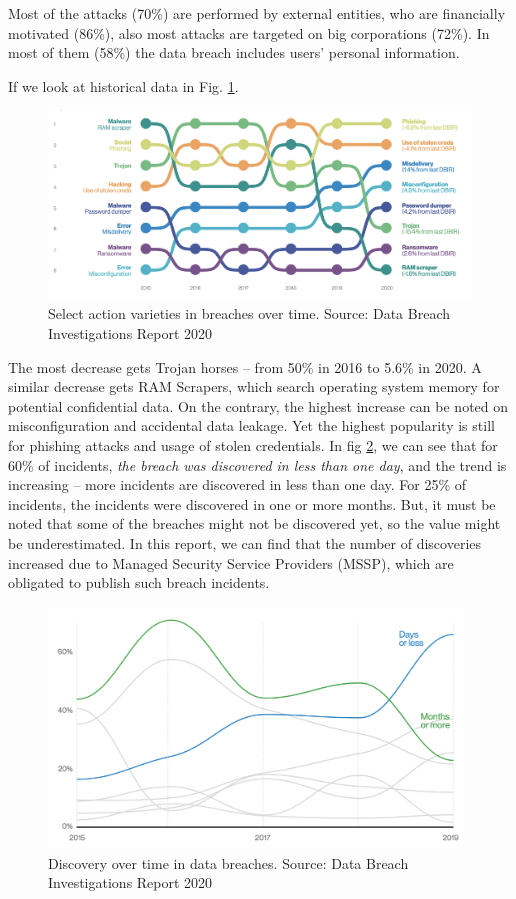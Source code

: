 \documentclass[nostrict]{szablonPG}
\begin{document}
Most of the attacks (70\%) are performed by external entities, who are financially motivated (86\%), also most attacks are targeted on big corporations (72\%). In most of them (58\%) the data breach includes users' personal information.  

If we look at historical data in Fig. \ref{fig:data-breach-historical}.
\begin{figure}[h!]
    \includegraphics[width=1\textwidth]{img/data-breach-historical.png}
    \centering
    \caption{Select action varieties in breaches over time. Source: Data Breach Investigations Report 2020}
    \label{fig:data-breach-historical}
\end{figure} 
The most decrease gets Trojan horses -- from 50\% in 2016 to 5.6\% in 2020. A similar decrease gets RAM Scrapers, which search operating system memory for potential confidential data. 
On the contrary, the highest increase can be noted on misconfiguration and accidental data leakage. Yet the highest popularity is still for phishing attacks and usage of stolen credentials. 
In fig \ref{fig:credentials-steal-discovery}, we can see that for 60\% of incidents, \textit{the breach was discovered in less than one day}, and the trend is increasing -- more incidents are discovered in less than one day. For 25\% of incidents, the incidents were discovered in one or more months. But, it must be noted that some of the breaches might not be discovered yet, so the value might be underestimated. In this report, we can find that the number of discoveries increased due to Managed Security Service Providers (MSSP), which are obligated to publish such breach incidents.

\begin{figure}[h!]
    \includegraphics[width=11cm]{img/credentials-steal-discovery.png}
    \centering
    \caption{Discovery over time in data breaches. Source: Data Breach Investigations Report 2020}
    \label{fig:credentials-steal-discovery}
\end{figure} 
\end{document}
